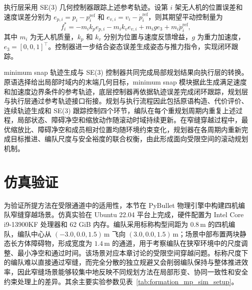 执行层采用 SE(3) 几何控制器跟踪上述参考轨迹。设第 $i$ 架无人机的位置误差和速度误差分别为 $e_{p,i} = p_{i} - p_{i}^{\mathrm{ref}}$ 和 $e_{v,i} = v_{i} - \dot{p}_{i}^{\mathrm{ref}}$，则其期望平动控制量为
\[
f_{i}^{*} = -m_{i} k_{p} e_{p,i} - m_{i} k_{v} e_{v,i} + m_{i} g e_{3} + m_{i} \ddot{p}_{i}^{\mathrm{ref}},
\]
其中 $m_{i}$ 为无人机质量，$k_{p}$ 和 $k_{v}$ 分别为位置与速度反馈增益，$g$ 为重力加速度，$e_{3} = [0,0,1]^{\top}$。控制器进一步结合姿态误差生成姿态与推力指令，实现闭环跟踪。

minimum snap 轨迹生成与 SE(3) 控制器共同完成局部规划结果向执行层的转换。原语选择给出局部时域内的末端几何目标，minimum snap 模块据此生成满足速度和加速度边界条件的参考轨迹，底层控制器再依据轨迹误差完成闭环跟踪，规划层与执行层通过参考轨迹接口衔接。规划与执行流程因此包括原语构造、代价评价、连续轨迹生成和 SE(3) 跟踪控制四个环节，编队在每个重规划周期内重复上述过程，局部状态、障碍净空和缩放动作随滚动时域持续更新。在窄缝穿越过程中，最优缩放比、障碍净空和成员相对位置均随环境约束变化，规划器在各周期内重新完成目标推进、编队尺度与安全裕度的联合权衡，由此形成面向受限空间的滚动规划机制。

\section{仿真验证}

为验证所提方法在受限通道中的适用性，本节在 PyBullet 物理引擎中构建四机编队窄缝穿越场景。仿真实验在 Ubuntu 22.04 平台上完成，硬件配置为 Intel Core i9-13900KF 处理器和 62 GiB 内存。编队采用标称构型间距为 $0.8\,\mathrm{m}$ 的四机编队，编队中心从 $(-3.0,0.0,1.5)\,\mathrm{m}$ 飞向 $(3.0,0.0,1.5)\,\mathrm{m}$；场景中部布置两块静态长方体障碍物，形成宽度为 $1.4\,\mathrm{m}$ 的通道，用于考察编队在狭窄环境中的尺度调整、最小净空和通过时间。该场景对应本章讨论的受限空间穿越问题。标称尺度下的编队难以直接通过窄缝，而完全分散的独立规避又会削弱编队保持与整体推进效率，因此窄缝场景能够较集中地反映不同规划方法在局部形变、协同一致性和安全约束处理上的差异。其余主要实验参数见表~\ref{tab:formation_mp_sim_setup}。

\setlength{\textfloatsep}{10bp plus 2bp minus 2bp}
\setlength{\floatsep}{10bp plus 2bp minus 2bp}
\setlength{\intextsep}{10bp plus 2bp minus 2bp}

